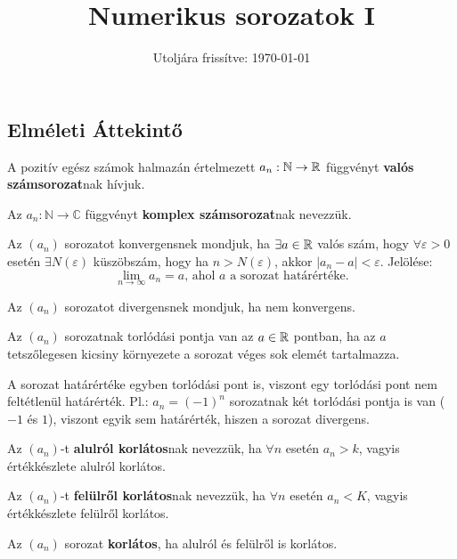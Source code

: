 \documentclass[a4paper, 12pt]{scrartcl}
\title{Numerikus sorozatok I}
\date{Utoljára frissítve: \today}
\begin{document}
\maketitle

\subsection{Elméleti Áttekintő}

\begin{definition}[Sorozat]
  A pozitív egész számok halmazán értelmezett $a_n : \mathbb N \rightarrow
    \mathbb{R}$ függvényt \textbf{valós számsorozat}nak hívjuk.

  Az $a_n:\mathbb N \rightarrow \mathbb C $ függvényt \textbf{komplex
    számsorozat}nak nevezzük.

\end{definition}

\begin{definition}[Konvergencia]
  Az $(a_n)$ sorozatot konvergensnek mondjuk, ha $\exists a \in \mathbb{R}$ valós
  szám, hogy $\forall \varepsilon > 0$ esetén $\exists N(\varepsilon)$
  küszöbszám, hogy ha $n > N(\varepsilon)$, akkor $|a_n - a| < \varepsilon$.
  Jelölése:
  \[
    \lim_{n \rightarrow \infty} a_n = a
    \text{, ahol $a$ a sorozat határértéke.}
  \]
\end{definition}

\begin{definition}[Divergencia]
  Az $(a_n)$ sorozatot divergensnek mondjuk, ha nem konvergens.
\end{definition}

\begin{definition}
  Az $(a_n)$ sorozatnak torlódási pontja van az $a \in \mathbb{R}$ pontban, ha az
  $a$ tetszőlegesen kicsiny környezete a sorozat véges sok elemét tartalmazza.
\end{definition}

\begin{note}
  A sorozat határértéke egyben torlódási pont is, viszont egy torlódási pont nem
  feltétlenül határérték. Pl.: $a_n = (-1)^n$ sorozatnak két torlódási pontja is
  van ($-1$ és $1$), viszont egyik sem határérték, hiszen a sorozat divergens.
\end{note}

\begin{definition}
  Az $(a_n)$-t \textbf{alulról korlátos}nak nevezzük, ha $\forall n$ esetén
  $a_n > k$, vagyis értékkészlete alulról korlátos.

  Az $(a_n)$-t \textbf{felülről korlátos}nak nevezzük, ha $\forall n$ esetén
  $a_n < K$, vagyis értékkészlete felülről korlátos.

  Az $(a_n)$ sorozat \textbf{korlátos}, ha alulról és felülről is korlátos.
\end{definition}
\end{document}
